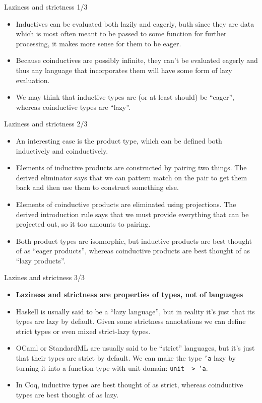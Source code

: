 \documentclass{beamer}
\begin{document}
\begin{frame}{Laziness and strictness 1/3}
\begin{itemize}
	\item Inductives can be evaluated both lazily and eagerly, buth since they are data which is most often meant to be passed to some function for further processing, it makes more sense for them to be eager.
	\item Because coinductives are possibly infinite, they can't be evaluated eagerly and thus any language that incorporates them will have some form of lazy evaluation.
	\item We may think that inductive types are (or at least should) be ``eager'', whereas coinductive types are ``lazy''.
\end{itemize}
\end{frame}

\begin{frame}{Laziness and strictness 2/3}
\begin{itemize}
	\item An interesting case is the product type, which can be defined both inductively and coinductively.
	\item Elements of inductive products are constructed by pairing two things. The derived eliminator says that we can pattern match on the pair to get them back and then use them to construct something else.
	\item Elements of coinductive products are eliminated using projections. The derived introduction rule says that we must provide everything that can be projected out, so it too amounts to pairing.
	\item Both product types are isomorphic, but inductive products are best thought of as ``eager products'', whereas coinductive products are best thought of as ``lazy products''.
\end{itemize}
\end{frame}

\begin{frame}{Lazines and strictness 3/3}
\begin{itemize}
	\item \textbf{Laziness and strictness are properties of types, not of languages}
	\item Haskell is usually said to be a ``lazy language'', but in reality it's just that its types are lazy by default. Given some strictness annotations we can define strict types or even mixed strict-lazy types.
	\item OCaml or StandardML are usually said to be ``strict'' languages, but it's just that their types are strict by default. We can make the type \texttt{'a} lazy by turning it into a function type with unit domain: \texttt{unit -> 'a}.
	\item In Coq, inductive types are best thought of as strict, whereas coinductive types are best thought of as lazy.
\end{itemize}
\end{frame}
\end{document}
